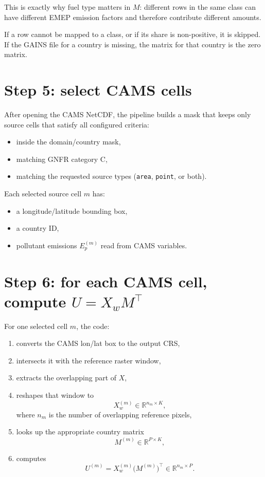 \documentclass[11pt,a4paper]{article}
\newcommand{\R}{\mathbb{R}}
\begin{document}
This is exactly why fuel type matters in $M$: different rows in the same class can
have different EMEP emission factors and therefore contribute different amounts.

If a row cannot be mapped to a class, or if its share is non-positive, it is skipped.
If the GAINS file for a country is missing, the matrix for that country is the zero matrix.

\section{Step 5: select CAMS cells}

After opening the CAMS NetCDF, the pipeline builds a mask that keeps only source cells
that satisfy all configured criteria:

\begin{itemize}[leftmargin=1.4em]
  \item inside the domain/country mask,
  \item matching GNFR category C,
  \item matching the requested source types (\texttt{area}, \texttt{point}, or both).
\end{itemize}

Each selected source cell $m$ has:

\begin{itemize}[leftmargin=1.4em]
  \item a longitude/latitude bounding box,
  \item a country ID,
  \item pollutant emissions $E_p^{(m)}$ read from CAMS variables.
\end{itemize}

\section{Step 6: for each CAMS cell, compute $U = X_w M^\top$}

For one selected cell $m$, the code:

\begin{enumerate}[leftmargin=1.4em]
  \item converts the CAMS lon/lat box to the output CRS,
  \item intersects it with the reference raster window,
  \item extracts the overlapping part of $X$,
  \item reshapes that window to
  \[
  X_w^{(m)} \in \R^{n_m \times K},
  \]
  where $n_m$ is the number of overlapping reference pixels,
  \item looks up the appropriate country matrix
  \[
  M^{(m)} \in \R^{P \times K},
  \]
  \item computes
  \[
  U^{(m)} = X_w^{(m)} \bigl(M^{(m)}\bigr)^\top \in \R^{n_m \times P}.
  \]
\end{enumerate}
\end{document}

